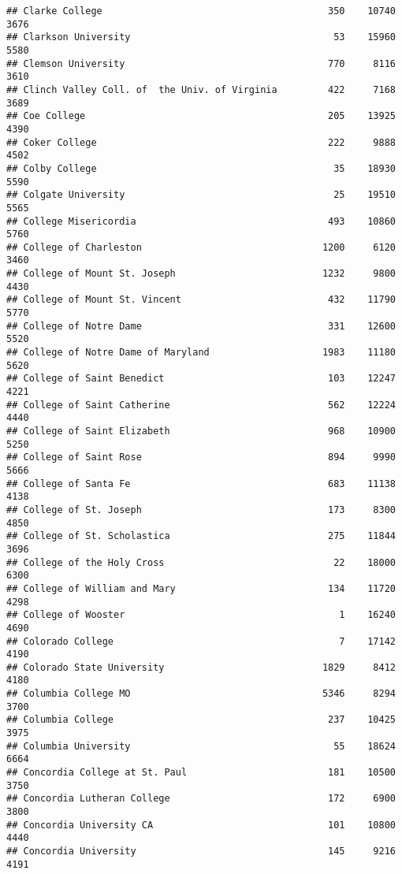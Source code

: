 \documentclass[
]{article}
\begin{document}
\begin{verbatim}
## Clarke College                                        350    10740       3676
## Clarkson University                                    53    15960       5580
## Clemson University                                    770     8116       3610
## Clinch Valley Coll. of  the Univ. of Virginia         422     7168       3689
## Coe College                                           205    13925       4390
## Coker College                                         222     9888       4502
## Colby College                                          35    18930       5590
## Colgate University                                     25    19510       5565
## College Misericordia                                  493    10860       5760
## College of Charleston                                1200     6120       3460
## College of Mount St. Joseph                          1232     9800       4430
## College of Mount St. Vincent                          432    11790       5770
## College of Notre Dame                                 331    12600       5520
## College of Notre Dame of Maryland                    1983    11180       5620
## College of Saint Benedict                             103    12247       4221
## College of Saint Catherine                            562    12224       4440
## College of Saint Elizabeth                            968    10900       5250
## College of Saint Rose                                 894     9990       5666
## College of Santa Fe                                   683    11138       4138
## College of St. Joseph                                 173     8300       4850
## College of St. Scholastica                            275    11844       3696
## College of the Holy Cross                              22    18000       6300
## College of William and Mary                           134    11720       4298
## College of Wooster                                      1    16240       4690
## Colorado College                                        7    17142       4190
## Colorado State University                            1829     8412       4180
## Columbia College MO                                  5346     8294       3700
## Columbia College                                      237    10425       3975
## Columbia University                                    55    18624       6664
## Concordia College at St. Paul                         181    10500       3750
## Concordia Lutheran College                            172     6900       3800
## Concordia University CA                               101    10800       4440
## Concordia University                                  145     9216       4191

\end{verbatim}
\end{document}
